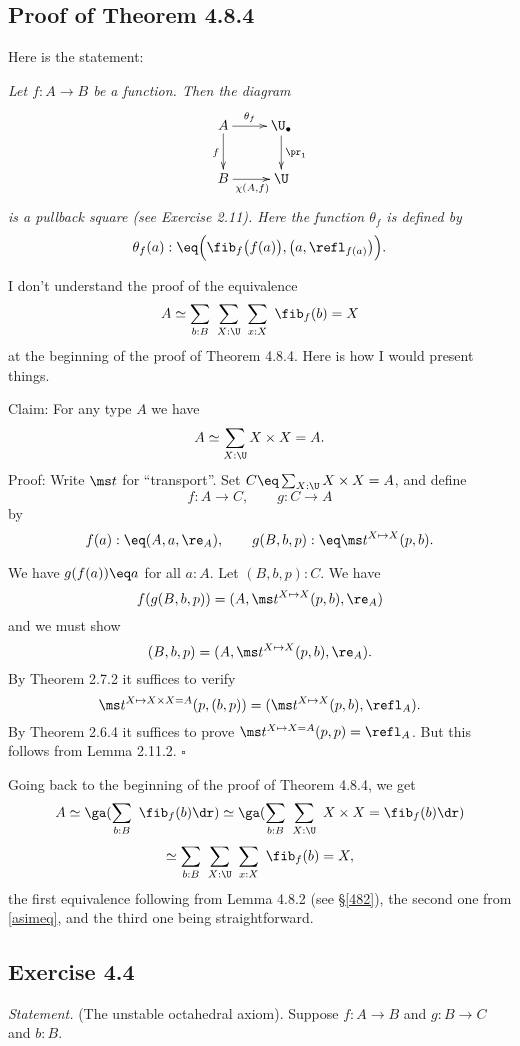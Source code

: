 \documentclass[12pt]{article}
\begin{document}

\subsection{Proof of Theorem 4.8.4}

Here is the statement:

\nn\emph{Let $f:A\to B$ be a function. Then the diagram
$$
\xymatrix{
A\ar[r]^-{\theta_f}\ar[d]_{f}&\U_\bullet\ar[d]^{\pr_1}\\
B\ar[r]_{\chi(A,f)} &\U}
$$ 
is a pullback square (see Exercise 2.11). Here the function $\theta_f$ is defined by}
$$
\theta_f(a):\eq\Big(\fib_f\big(f(a)\big),\big(a,\refl_{f(a)}\big)\Big).
$$

I don't understand the proof of the equivalence 
$$
A\simeq\sum_{b:B}\ \sum_{X:\U}\ \sum_{x:X}\ \fib_f(b)=X
$$ 
at the beginning of the proof of Theorem 4.8.4. Here is how I would present things. 

\nn Claim: For any type $A$ we have 
\begin{equation}\label{asimeq}
A\simeq\sum_{X:\U}X\times X=A.
\end{equation}
Proof: Write $\ms t$ for ``transport''. Set $C\eq\sum_{X:\U}X\times X=A$, and define 
$$
f:A\to C,\qquad g:C\to A
$$ 
by 
$$
f(a):\eq(A,a,\re_A),\qquad g(B,b,p):\eq\ms t^{X\mapsto X}(p,b).
$$ 

\nn We have $g(f(a))\eq a$ for all $a:A$. Let $(B,b,p):C$. We have 
$$
f(g(B,b,p))=(A,\ms t^{X\mapsto X}(p,b),\re_A)
$$ 
and we must show 
$$
(B,b,p)=(A,\ms t^{X\mapsto X}(p,b),\re_A).
$$
By Theorem 2.7.2 it suffices to verify 
$$
\ms t^{X\mapsto X\times X=A}(p,(b,p))=(\ms t^{X\mapsto X}(p,b),\refl_A).
$$ 
By Theorem 2.6.4 it suffices to prove $\ms t^{X\mapsto X=A}(p,p)=\refl_A$. But this follows from Lemma 2.11.2. $\square$

Going back to the beginning of the proof of Theorem 4.8.4, we get 
$$
A\simeq\ga(\sum_{b:B}\ \fib_f(b)\dr)\simeq\ga(\sum_{b:B}\ \sum_{X:\U}\ X\times X=\fib_f(b)\dr)
$$
$$
\simeq\sum_{b:B}\ \sum_{X:\U}\ \sum_{x:X}\ \fib_f(b)=X,
$$ 
the first equivalence following from Lemma 4.8.2 (see \S\ref{482}), the second one from \eqref{asimeq}, and the third one being straightforward.


\subsection{Exercise 4.4}

\emph{Statement.} (The unstable octahedral axiom). Suppose $f:A\to B$ and $g:B\to C$ and $b:B$.
\end{document}
